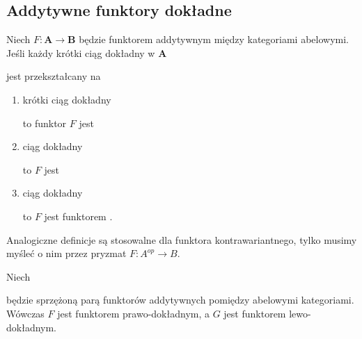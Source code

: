 \subsection{Addytywne funktory dokładne}

\begin{definition}
  Niech $F:\mathbf{A}\to \mathbf{B}$ będzie funktorem addytywnym między kategoriami abelowymi. Jeśli każdy krótki ciąg dokładny w $\mathbf{A}$ 
  \begin{center}\end{center}
  jest przekształcany na 
  \begin{enumerate}[label=(\alph*)] 
    \item krótki ciąg dokładny 
      \begin{center}\end{center} 
      to funktor $F$ jest 
    \item ciąg dokładny 
      \begin{center}\end{center} 
      to $F$ jest 
    \item ciąg dokładny
      \begin{center}\end{center} 
      to $F$ jest funktorem .
  \end{enumerate}
\end{definition}

Analogiczne definicje są stosowalne dla funktora kontrawariantnego, tylko musimy myśleć o nim przez pryzmat $F:A^{op}\to B$.

\begin{fact}
  Niech  będzie sprzężoną parą funktorów addytywnych pomiędzy abelowymi kategoriami. Wówczas $F$ jest funktorem prawo-dokładnym, a $G$ jest funktorem lewo-dokładnym.
\end{fact}

